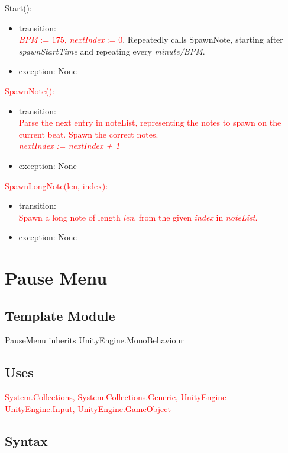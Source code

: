 \documentclass[12pt]{article}
\begin{document}
\noindent Start():
\begin{itemize}
	\item transition:\\
	    \textcolor{red}{\textit{BPM} := 175, \textit{nextIndex} := 0}. Repeatedly calls SpawnNote, starting after \textit{spawnStartTime} and repeating every \textit{minute/BPM}.
	\item exception: None
\end{itemize}

\noindent \textcolor{red}{SpawnNote():}
\begin{itemize}
	\item transition:\\
	    \textcolor{red}{Parse the next entry in noteList, representing the notes to spawn on the current beat. Spawn the correct notes.\\
	    \textit{nextIndex := nextIndex + 1}}
	\item exception: None
\end{itemize}

\noindent \textcolor{red}{SpawnLongNote(len, index):}
\begin{itemize}
	\item transition:\\
	    \textcolor{red}{Spawn a long note of length \textit{len}, from the given \textit{index} in \textit{noteList}.}
	\item exception: None
\end{itemize}

\newpage
\section{Pause Menu}

\subsection{Template Module}
PauseMenu inherits UnityEngine.MonoBehaviour

\subsection {Uses}
\textcolor{red}{System.Collections, System.Collections.Generic, UnityEngine\\ \sout{UnityEngine.Input, UnityEngine.GameObject}}

\subsection {Syntax}
\end{document}

